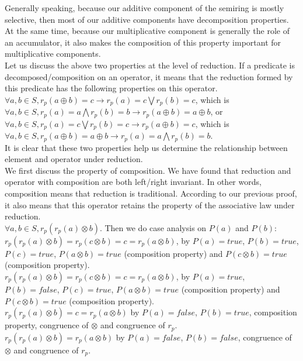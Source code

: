 \documentclass[a4paper,10pt]{article}
\begin{document}
Generally speaking, because our additive component of the semiring is mostly selective, then most of our additive components have decomposition properties. At the same time, because our multiplicative component is generally the role of an accumulator, it also makes the composition of this property important for multiplicative components.\\
Let us discuss the above two properties at the level of reduction. If a predicate is decomposed/composition on an operator, it means that the reduction formed by this predicate has the following properties on this operator.\\
$\forall a,b \in S, r_p(a\oplus b) = c \rightarrow r_p(a) = c \bigvee r_p (b) = c$, which is 
$\forall a,b \in S, r_p(a) = a \bigwedge r_p (b) = b \rightarrow r_p(a \oplus b)= a \oplus b$, or\\
$\forall a,b \in S, r_p(a) = c \bigvee r_p (b) = c \rightarrow r_p(a \oplus b)= c$, which is 
$\forall a,b \in S, r_p(a\oplus b) = a \oplus b \rightarrow r_p(a) = a \bigwedge r_p (b) = b$.\\
It is clear that these two properties help us determine the relationship between element and operator under reduction.\\
We first discuss the property of composition. 
We have found that reduction and operator with composition are both left/right invariant.
In other words, composition means that reduction is traditional. According to our previous proof, it also means that this operator retains the property of the associative law under reduction.\\
$\forall a,b \in S, r_p(r_p(a) \otimes b)$. Then we do case analysis on $P(a)$ and $P(b)$:\\
$r_p(r_p(a) \otimes b) = r_p(c \otimes b) = c = r_p(a \otimes b)$, by $P(a) = true$, $P(b) = true$, $P(c) = true$, $P(a \otimes b) = true$ (composition property) and $P(c \otimes b) = true$ (composition property).\\
$r_p(r_p(a) \otimes b) = r_p(c \otimes b) = c = r_p(a \otimes b)$, by $P(a) = true$, $P(b) = false$, $P(c) = true$, $P(a \otimes b) = true$ (composition property) and $P(c \otimes b) = true$ (composition property).\\
$r_p(r_p(a) \otimes b) = c = r_p(a \otimes b)$ by $P(a) = false$, $P(b) = true$, composition property, congruence of $\otimes$ and congruence of $r_p$.\\
$r_p(r_p(a) \otimes b) = r_p(a \otimes b)$ by $P(a) = false$, $P(b) = false$, congruence of $\otimes$ and congruence of $r_p$.\\
\end{document}
